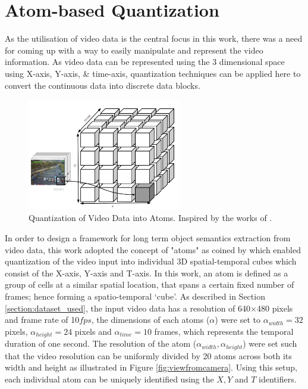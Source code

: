 \section{Atom-based Quantization}
\label{section:atoms}

As the utilisation of video data is the central focus in this work, there was a need for coming up with a way to easily manipulate and represent the video information. As video data can be  represented using the 3 dimensional space using X-axis, Y-axis, \& time-axis, quantization techniques can be applied here to convert the continuous data into discrete data blocks.     


\begin{figure}[H]\centering
\includegraphics[width=0.6\textwidth]{image/general/atom.PNG}
\caption[Quantization of Video Data into Atoms.]
{Quantization of Video Data into Atoms.
Inspired by the works of .}
\label{fig:atoms}
\end{figure}


In order to design a framework for long term object semantics extraction from video data, this work adopted the concept of "atoms" as coined by \cite{castanon2016retrieval} which enabled quantization of the video input into individual 3D spatial-temporal cubes which consist of the X-axis, Y-axis and T-axis. In this work, an atom is defined as a group of cells at a similar spatial location, that spans a certain fixed number of frames; hence forming a spatio-temporal `cube'.
As described in Section \ref{section:dataset_used}, the input video data has a resolution of 640$\times$480 pixels and frame rate of 10$fps$, the dimensions of each atoms ($\alpha$) were set to $\alpha_{width}=32$ pixels, $\alpha_{height}=24$ pixels and $\alpha_{time}=10$ frames, which represents the temporal duration of one second. The resolution of the atom ($\alpha_{width},\alpha_{height}$) were set such that the video resolution can be uniformly divided by 20 atoms across both its width and height as illustrated in Figure \ref{fig:viewfromcamera}. Using this setup, each individual atom can be uniquely identified using the $X, Y$ and $T$ identifiers. 


